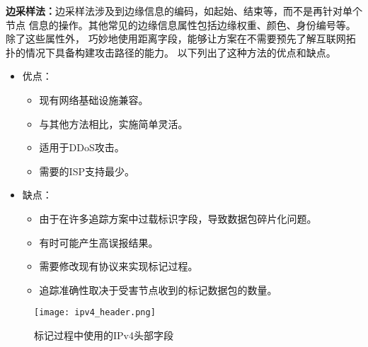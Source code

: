 \textbf{边采样法：}边采样法涉及到边缘信息的编码，如起始、结束等，而不是再针对单个节点
信息的操作。其他常见的边缘信息属性包括边缘权重、颜色、身份编号等。除了这些属性外，
巧妙地使用距离字段，能够让方案在不需要预先了解互联网拓扑的情况下具备构建攻击路径的能力。
以下列出了这种方法的优点和缺点。
\begin{itemize}
  \item 优点：
  \begin{itemize}
    \item 现有网络基础设施兼容。
    \item 与其他方法相比，实施简单灵活。
    \item 适用于DDoS攻击。
    \item 需要的ISP支持最少。
  \end{itemize}
  \item 缺点：
  \begin{itemize}
    \item 由于在许多追踪方案中过载标识字段，导致数据包碎片化问题。
    \item 有时可能产生高误报结果。
    \item 需要修改现有协议来实现标记过程。
    \item 追踪准确性取决于受害节点收到的标记数据包的数量。
  \end{itemize}
\end{itemize}




\begin{figure}[htbp]
  \centering
  \texttt{[image: ipv4\_header.png]}
  \caption{标记过程中使用的IPv4头部字段}
  \label{fig:ipv4_header}
\end{figure}


